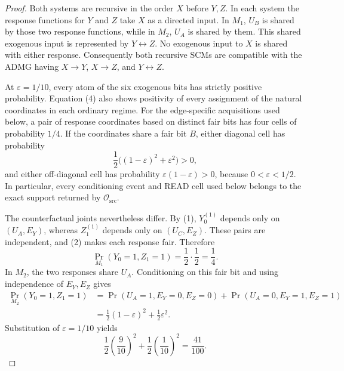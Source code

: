 \documentclass{article}
\begin{document}
\begin{proof}
Both systems are recursive in the order \(X\) before \(Y,Z\).  In each system the response functions for \(Y\) and \(Z\) take \(X\) as a directed input.  In \(M_1\), \(U_B\) is shared by those two response functions, while in \(M_2\), \(U_A\) is shared by them.  This shared exogenous input is represented by \(Y\leftrightarrow Z\).  No exogenous input to \(X\) is shared with either response.  Consequently both recursive SCMs are compatible with the ADMG having \(X\to Y\), \(X\to Z\), and \(Y\leftrightarrow Z\).

At \(\varepsilon=1/10\), every atom of the six exogenous bits has strictly positive probability.  Equation (4) also shows positivity of every assignment of the natural coordinates in each ordinary regime.  For the edge-specific acquisitions used below, a pair of response coordinates based on distinct fair bits has four cells of probability \(1/4\).  If the coordinates share a fair bit \(B\), either diagonal cell has probability
\[
 \frac12\bigl((1-\varepsilon)^2+\varepsilon^2\bigr)>0,
\]
and either off-diagonal cell has probability \(\varepsilon(1-\varepsilon)>0\), because \(0<\varepsilon<1/2\).  In particular, every conditioning event and READ cell used below belongs to the exact support returned by \(\mathcal O_{\mathrm{src}}\).

The counterfactual joints nevertheless differ.  By (1), \(Y_0^{(1)}\) depends only on \((U_A,E_Y)\), whereas \(Z_1^{(1)}\) depends only on \((U_C,E_Z)\).  These pairs are independent, and (2) makes each response fair.  Therefore
\[
 \Pr_{M_1}(Y_0=1,Z_1=1)=\frac12\cdot\frac12=\frac14.
\tag{5}
\]
In \(M_2\), the two responses share \(U_A\).  Conditioning on this fair bit and using independence of \(E_Y,E_Z\) gives
\[
\begin{aligned}
 \Pr_{M_2}(Y_0=1,Z_1=1)
 &=\Pr(U_A=1,E_Y=0,E_Z=0)
   +\Pr(U_A=0,E_Y=1,E_Z=1)\\
 &=\frac12(1-\varepsilon)^2+\frac12\varepsilon^2.
\end{aligned}
\tag{6}
\]
Substitution of \(\varepsilon=1/10\) yields
\[
 \frac12\left(\frac9{10}\right)^2+
 \frac12\left(\frac1{10}\right)^2
 =\frac{41}{100}.
\tag{7}
\]


\end{proof}
\end{document}
